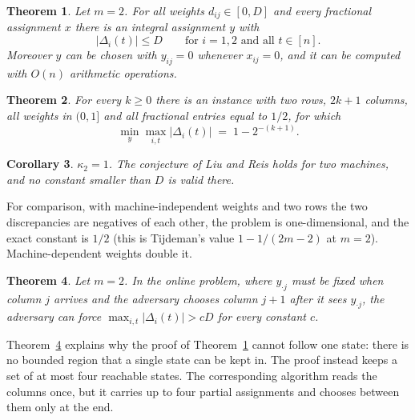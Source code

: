 \documentclass[11pt]{article}
\newtheorem{theorem}{Theorem}
\newtheorem{corollary}[theorem]{Corollary}
\theoremstyle{definition}
\newcommand{\disc}{\Delta}
\begin{document}
\begin{theorem}\label{thm:upper}
Let $m=2$.  For all weights $d_{ij}\in[0,D]$ and every fractional
assignment $x$ there is an integral assignment $y$ with
\[
 |\disc_i(t)|\le D\qquad\text{for }i=1,2\text{ and all }t\in[n].
\]
Moreover $y$ can be chosen with $y_{ij}=0$ whenever $x_{ij}=0$, and it can
be computed with $O(n)$ arithmetic operations.
\end{theorem}

\begin{theorem}\label{thm:lower}
For every $k\ge0$ there is an instance with two rows, $2k+1$ columns, all
weights in $(0,1]$ and all fractional entries equal to $1/2$, for which
\[
 \min_y\max_{i,t}|\disc_i(t)|\;=\;1-2^{-(k+1)} .
\]
\end{theorem}

\begin{corollary}
$\kappa_2=1$.  The conjecture of Liu and Reis holds for two machines, and
no constant smaller than $D$ is valid there.
\end{corollary}

For comparison, with machine-independent weights and two rows the two
discrepancies are negatives of each other, the problem is
one-dimensional, and the exact constant is $1/2$ (this is Tijdeman's
value $1-1/(2m-2)$ at $m=2$).  Machine-dependent weights double it.

\begin{theorem}\label{thm:online}
Let $m=2$.  In the online problem, where $y_{\cdot j}$ must be fixed when
column $j$ arrives and the adversary chooses column $j+1$ after it sees
$y_{\cdot j}$, the adversary can force $\max_{i,t}|\disc_i(t)|>cD$ for
every constant $c$.
\end{theorem}

Theorem~\ref{thm:online} explains why the proof of
Theorem~\ref{thm:upper} cannot follow one state: there is no bounded
region that a single state can be kept in.  The proof instead keeps a set
of at most four reachable states.  The corresponding algorithm reads the
columns once, but it carries up to four partial assignments and chooses
between them only at the end.
\end{document}
